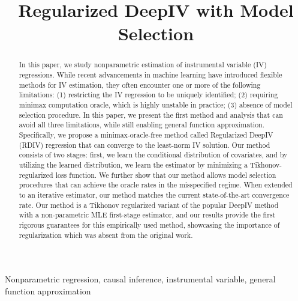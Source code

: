 \documentclass[12pt]{colt2024} %
\title[Regularized DeepIV with Model Selection]{Regularized DeepIV with Model Selection}
\begin{document}
\maketitle

\begin{abstract}%
In this paper, we study nonparametric estimation of instrumental variable (IV) regressions. While recent advancements in machine learning have introduced flexible methods for IV estimation, they often encounter one or more of the following limitations: (1) restricting the IV regression to be uniquely identified; (2) requiring minimax computation oracle, which is highly unstable in practice; (3) absence of model selection procedure.  In this paper, we present the first method and analysis that can avoid all three limitations, while still enabling general function approximation. Specifically, we propose a minimax-oracle-free method called Regularized DeepIV (RDIV) regression that can converge to the least-norm IV solution. Our method consists of two stages: first, we learn the conditional distribution of covariates, and by utilizing the learned distribution,  we learn the estimator by minimizing a Tikhonov-regularized loss function. We further show that our method allows model selection procedures that can achieve the oracle rates in the misspecified regime. When extended to an iterative estimator, our method matches the current state-of-the-art convergence rate. Our method is a Tikhonov regularized variant of the popular DeepIV method with a non-parametric MLE first-stage estimator, and our results provide the first rigorous guarantees for this empirically used method, showcasing the importance of regularization which was absent from the original work.
\end{abstract}

\begin{keywords}%
  Nonparametric regression, causal inference, instrumental variable, general function approximation%
\end{keywords}









\end{document}
